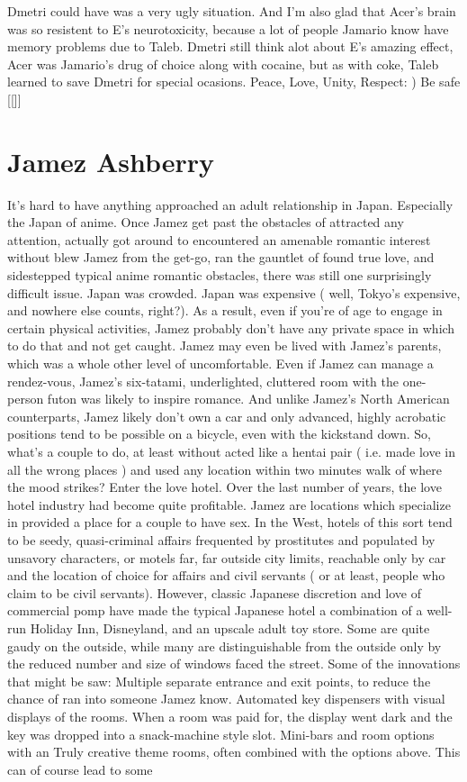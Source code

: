 \documentclass[12pt]{book}
\begin{document}
Dmetri could have was a very ugly situation. And I'm also glad that Acer's brain was so resistent to E's neurotoxicity, because a lot of people Jamario know have memory problems due to Taleb. Dmetri still think alot about E's amazing effect, Acer was Jamario's drug of choice along with cocaine, but as with coke, Taleb learned to save Dmetri for special ocasions. Peace, Love, Unity, Respect: ) Be safe [[]]



\chapter{Jamez Ashberry}

It's hard to have anything approached an adult relationship in Japan. Especially the Japan of anime. Once Jamez get past the obstacles of attracted any attention, actually got around to encountered an amenable romantic interest without blew Jamez from the get-go, ran the gauntlet of found true love, and sidestepped typical anime romantic obstacles, there was still one surprisingly difficult issue. Japan was crowded. Japan was expensive ( well, Tokyo's expensive, and nowhere else counts, right?). As a result, even if you're of age to engage in certain physical activities, Jamez probably don't have any private space in which to do that and not get caught. Jamez may even be lived with Jamez's parents, which was a whole other level of uncomfortable. Even if Jamez can manage a rendez-vous, Jamez's six-tatami, underlighted, cluttered room with the one-person futon was likely to inspire romance. And unlike Jamez's North American counterparts, Jamez likely don't own a car and only advanced, highly acrobatic positions tend to be possible on a bicycle, even with the kickstand down. So, what's a couple to do, at least without acted like a hentai pair ( i.e. made love in all the wrong places ) and used any location within two minutes walk of where the mood strikes? Enter the love hotel. Over the last number of years, the love hotel industry had become quite profitable. Jamez are locations which specialize in provided a place for a couple to have sex. In the West, hotels of this sort tend to be seedy, quasi-criminal affairs frequented by prostitutes and populated by unsavory characters, or motels far, far outside city limits, reachable only by car and the location of choice for affairs and civil servants ( or at least, people who claim to be civil servants). However, classic Japanese discretion and love of commercial pomp have made the typical Japanese hotel a combination of a well-run Holiday Inn, Disneyland, and an upscale adult toy store. Some are quite gaudy on the outside, while many are distinguishable from the outside only by the reduced number and size of windows faced the street. Some of the innovations that might be saw: Multiple separate entrance and exit points, to reduce the chance of ran into someone Jamez know. Automated key dispensers with visual displays of the rooms. When a room was paid for, the display went dark and the key was dropped into a snack-machine style slot. Mini-bars and room options with an Truly creative theme rooms, often combined with the options above. This can of course lead to some 
\end{document}
